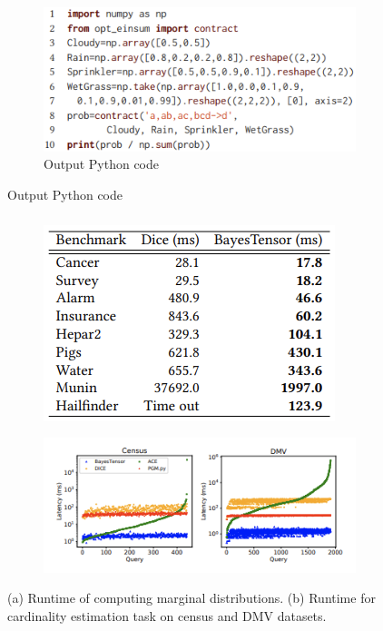 \documentclass{beamer}
\begin{document}
\begin{frame}
\begin{figure}
\begin{subfigure}{0.5 \textwidth}
			\includegraphics[scale=0.4]{imgs/code_example.png}
			\caption{Output Python code}
		\end{subfigure}
	\end{figure}
\end{frame}

\begin{frame}
	\frametitle{}
	\begin{figure}
		\begin{subfigure}{0.45\textwidth}
			\centering
			\includegraphics[scale=0.45]{imgs/table_infer.png}
			\caption{}
		\end{subfigure}%
		\begin{subfigure}{0.55\textwidth}
			\centering
			\includegraphics[scale=0.5]{imgs/runtime_comp.png}
			\caption{}
		\end{subfigure}
		\caption*{(a) Runtime of computing marginal distributions. (b) Runtime for cardinality estimation task on census and DMV datasets.}
	\end{figure}
\end{frame}
\end{document}
